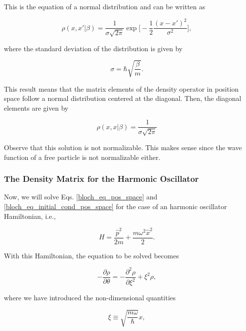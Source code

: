 \documentclass{article}
\begin{document}
This is the equation of a normal distribution and can be written as

\begin{equation}\label{density_matrix_free_particle}
    \rho(x, x' | \beta) = \frac{1}{\sigma \sqrt{2\pi}}\exp\bigg[-\frac{1}{2} \frac{(x-x')^{2}}{\sigma^{2}} \bigg],
\end{equation}

where the standard deviation of the distribution is given by

\begin{equation}\label{free_particle_density_mat}
    \sigma = \hbar \sqrt{\frac{\beta}{m}}.
\end{equation}

This result means that the matrix elements of the density operator in position space follow a normal distribution centered at the diagonal. Then, the diagonal elements are given by

\begin{equation}\label{free_particle_density_mat_diagonal}
    \rho(x, x | \beta) = \frac{1}{\sigma \sqrt{2\pi}}
\end{equation}

Observe that this solution is not normalizable. This makes sense since the wave function of a free particle is not normalizable either.

\subsubsection{The Density Matrix for the Harmonic Oscillator}
Now, we will solve Eqs. \ref{bloch_eq_pos_space} and \ref{bloch_eq_initial_cond_pos_space} for the case of an harmonic oscillator Hamiltonian, i.e.,

\begin{equation}
    H = \frac{\hat{p}^{2}}{2m} + \frac{m \omega^{2} \hat{x}^{2}}{2}.
\end{equation}

With this Hamiltonian, the equation to be solved becomes

\begin{equation}\label{oscillator_pde}
    -\frac{\partial \rho}{\partial \theta} = -\frac{\partial^{2} \rho}{\partial \xi^{2}} + \xi^{2}\rho,
\end{equation}

where we have introduced the non-dimensional quantities

\begin{equation}
    \xi \equiv \sqrt{\frac{m \omega}{\hbar}} x,
\end{equation}
\end{document}
